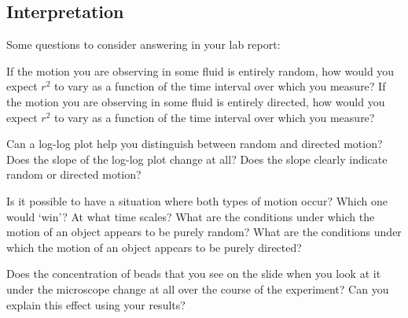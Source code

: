 \subsection*{Interpretation}
Some questions to consider answering in your lab report:
\begin{list}{-}{}
\item If the motion you are observing in some fluid is entirely random, how would you expect $r^{2}$ to vary as a function of the time interval over which you measure? 
If the motion you are observing in some fluid is entirely directed, how would you expect $r^{2}$ to vary as a function of the time interval over which you measure? 
\item Can a log-log plot help you distinguish between random and directed motion? 
Does the slope of the log-log plot change at all? 
Does the slope clearly indicate random or directed motion? 
\item Is it possible to have a situation where both types of motion occur? 
Which one would ‘win'? 
At what time scales? 
What are the conditions under which the motion of an object appears to be purely random? 
What are the conditions under which the motion of an object appears to be purely directed? 
\item Does the concentration of beads that you see on the slide when you look at it under the microscope change at all over the course of the experiment? 
Can you explain this effect using your results?
\end{list}